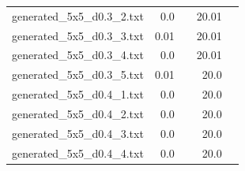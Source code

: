 \documentclass{article}
\begin{document}
\begin{center}
\begin{tabular}{lrrrr}
generated\_5x5\_d0.3\_2.txt & 0.0 & 
 & 20.01 & 
\\
generated\_5x5\_d0.3\_3.txt & 0.01 & 
 & 20.01 & 
\\
generated\_5x5\_d0.3\_4.txt & 0.0 & 
 & 20.01 & 
\\
generated\_5x5\_d0.3\_5.txt & 0.01 & 
 & 20.0 & 
\\
generated\_5x5\_d0.4\_1.txt & 0.0 & 
 & 20.0 & 
\\
generated\_5x5\_d0.4\_2.txt & 0.0 & 
 & 20.0 & 
\\
generated\_5x5\_d0.4\_3.txt & 0.0 & 
 & 20.0 & 
\\
generated\_5x5\_d0.4\_4.txt & 0.0 & 
 & 20.0 & 
\\
\hline\end{tabular}
\end{center}
\end{document}
